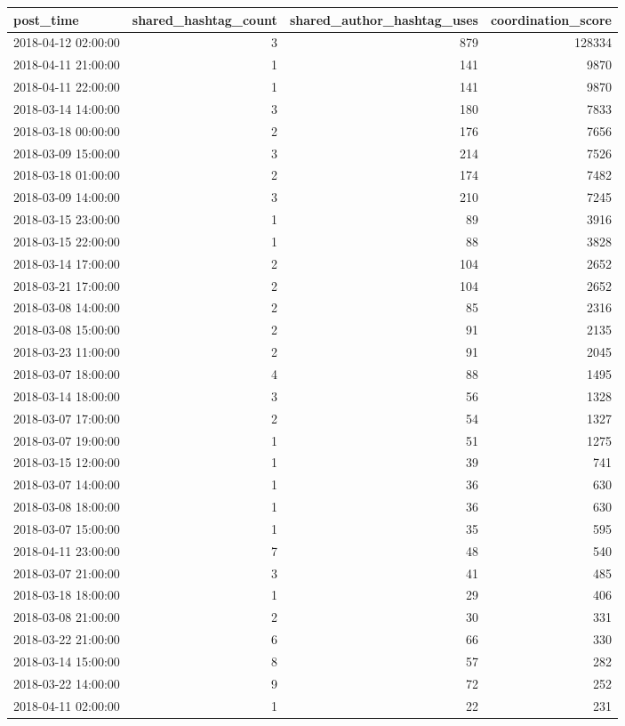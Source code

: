 \begin{tabular}{lrrr}
\toprule
post\_time & shared\_hashtag\_count & shared\_author\_hashtag\_uses & coordination\_score \\
\midrule
2018-04-12 02:00:00 & 3 & 879 & 128334 \\
2018-04-11 21:00:00 & 1 & 141 & 9870 \\
2018-04-11 22:00:00 & 1 & 141 & 9870 \\
2018-03-14 14:00:00 & 3 & 180 & 7833 \\
2018-03-18 00:00:00 & 2 & 176 & 7656 \\
2018-03-09 15:00:00 & 3 & 214 & 7526 \\
2018-03-18 01:00:00 & 2 & 174 & 7482 \\
2018-03-09 14:00:00 & 3 & 210 & 7245 \\
2018-03-15 23:00:00 & 1 & 89 & 3916 \\
2018-03-15 22:00:00 & 1 & 88 & 3828 \\
2018-03-14 17:00:00 & 2 & 104 & 2652 \\
2018-03-21 17:00:00 & 2 & 104 & 2652 \\
2018-03-08 14:00:00 & 2 & 85 & 2316 \\
2018-03-08 15:00:00 & 2 & 91 & 2135 \\
2018-03-23 11:00:00 & 2 & 91 & 2045 \\
2018-03-07 18:00:00 & 4 & 88 & 1495 \\
2018-03-14 18:00:00 & 3 & 56 & 1328 \\
2018-03-07 17:00:00 & 2 & 54 & 1327 \\
2018-03-07 19:00:00 & 1 & 51 & 1275 \\
2018-03-15 12:00:00 & 1 & 39 & 741 \\
2018-03-07 14:00:00 & 1 & 36 & 630 \\
2018-03-08 18:00:00 & 1 & 36 & 630 \\
2018-03-07 15:00:00 & 1 & 35 & 595 \\
2018-04-11 23:00:00 & 7 & 48 & 540 \\
2018-03-07 21:00:00 & 3 & 41 & 485 \\
2018-03-18 18:00:00 & 1 & 29 & 406 \\
2018-03-08 21:00:00 & 2 & 30 & 331 \\
2018-03-22 21:00:00 & 6 & 66 & 330 \\
2018-03-14 15:00:00 & 8 & 57 & 282 \\
2018-03-22 14:00:00 & 9 & 72 & 252 \\
2018-04-11 02:00:00 & 1 & 22 & 231 \\

\end{tabular}
